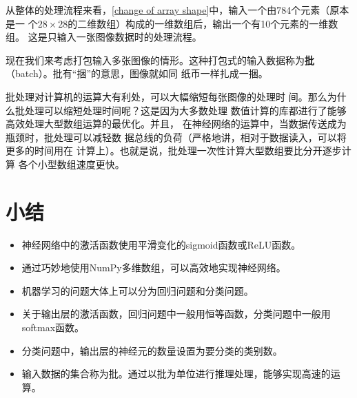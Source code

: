 从整体的处理流程来看，\autoref{change of array shape}中，输入一个由784个元素（原本是一
个$28\times 28$的二维数组）构成的一维数组后，输出一个有10个元素的一维数组。
这是只输入一张图像数据时的处理流程。

现在我们来考虑打包输入多张图像的情形。这种打包式的输入数据称为\textbf{批}（batch）。批有“捆”的意思，图像就如同
纸币一样扎成一捆。

\begin{tcolorbox}
    批处理对计算机的运算大有利处，可以大幅缩短每张图像的处理时
    间。那么为什么批处理可以缩短处理时间呢？这是因为大多数处理
    数值计算的库都进行了能够高效处理大型数组运算的最优化。并且，
    在神经网络的运算中，当数据传送成为瓶颈时，批处理可以减轻数
    据总线的负荷（严格地讲，相对于数据读入，可以将更多的时间用在
    计算上）。也就是说，批处理一次性计算大型数组要比分开逐步计算
    各个小型数组速度更快。
\end{tcolorbox}


\section{小结}
\begin{itemize}
    \item 神经网络中的激活函数使用平滑变化的sigmoid函数或ReLU函数。
    \item 通过巧妙地使用NumPy多维数组，可以高效地实现神经网络。
    \item 机器学习的问题大体上可以分为回归问题和分类问题。
    \item 关于输出层的激活函数，回归问题中一般用恒等函数，分类问题中一般用softmax函数。
    \item 分类问题中，输出层的神经元的数量设置为要分类的类别数。
    \item 输入数据的集合称为批。通过以批为单位进行推理处理，能够实现高速的运算。
\end{itemize}